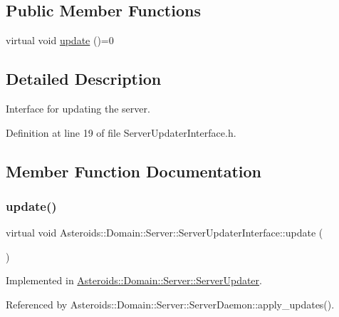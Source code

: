 \subsection*{Public Member Functions}
\begin{DoxyCompactItemize}
\item 
virtual void \hyperlink{classAsteroids_1_1Domain_1_1Server_1_1ServerUpdaterInterface_a361160b4683c46d96833943873de0c2c}{update} ()=0
\end{DoxyCompactItemize}


\subsection{Detailed Description}
Interface for updating the server. 

Definition at line 19 of file Server\+Updater\+Interface.\+h.



\subsection{Member Function Documentation}
\mbox{\label{classAsteroids_1_1Domain_1_1Server_1_1ServerUpdaterInterface_a361160b4683c46d96833943873de0c2c}} 
\subsubsection{\texorpdfstring{update()}{update()}}
{\footnotesize\ttfamily virtual void Asteroids\+::\+Domain\+::\+Server\+::\+Server\+Updater\+Interface\+::update (\begin{DoxyParamCaption}{ }\end{DoxyParamCaption})\hspace{0.3cm}{\ttfamily [pure virtual]}}



Implemented in \hyperlink{classAsteroids_1_1Domain_1_1Server_1_1ServerUpdater_a9f4250008b2c855699c59945890e88cd}{Asteroids\+::\+Domain\+::\+Server\+::\+Server\+Updater}.



Referenced by Asteroids\+::\+Domain\+::\+Server\+::\+Server\+Daemon\+::apply\+\_\+updates().

